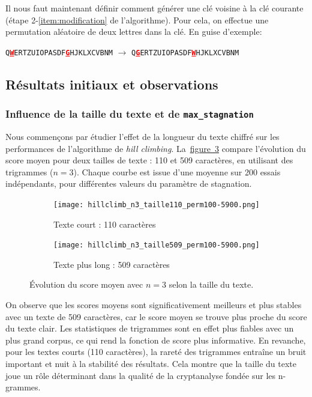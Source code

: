 \documentclass[a4paper]{article}
\newcommand{\figref}[1]{\hyperref[#1]{figure~\ref*{#1}}}
\newcommand{\highlight}[1]{\textbf{\textcolor{red}{\underline{#1}}}}
\begin{document}
Il nous faut maintenant définir comment générer une clé voisine à la clé courante (étape 2-\ref{item:modification} de l’algorithme).  
Pour cela, on effectue une permutation aléatoire de deux lettres dans la clé. En guise d'exemple:
\begin{center}
\texttt{Q\highlight{W}ERTZUIOPASDF\highlight{G}HJKLXCVBNM} $\rightarrow$ \texttt{Q\highlight{G}ERTZUIOPASDF\highlight{W}HJKLXCVBNM}
\end{center}

\subsection{Résultats initiaux et observations}

\subsubsection{Influence de la taille du texte et de \texttt{max\_stagnation}}

Nous commençons par étudier l’effet de la longueur du texte chiffré sur les performances de l’algorithme de \textit{hill climbing}. La~\figref{fig:n3-tailles} compare l’évolution du score moyen pour deux tailles de texte : 110 et 509 caractères, en utilisant des trigrammes ($n = 3$). Chaque courbe est issue d’une moyenne sur 200 essais indépendants, pour différentes valeurs du paramètre de stagnation.

\begin{figure}[H]
    \centering
    \begin{subfigure}[b]{0.49\textwidth}
        \texttt{[image: hillclimb\_n3\_taille110\_perm100-5900.png]}
        \caption{Texte court : 110 caractères}
        \label{fig:n3-110}
    \end{subfigure}
    \hfill
    \begin{subfigure}[b]{0.49\textwidth}
        \texttt{[image: hillclimb\_n3\_taille509\_perm100-5900.png]}
        \caption{Texte plus long : 509 caractères}
        \label{fig:n3-509}
    \end{subfigure}
    \caption{Évolution du score moyen avec $n = 3$ selon la taille du texte.}
    \label{fig:n3-tailles}
\end{figure}

On observe que les scores moyens sont significativement meilleurs et plus stables avec un texte
de 509 caractères, car le score moyen se trouve plus proche du score du texte clair. Les statistiques
de trigrammes sont en effet plus fiables avec un plus grand corpus, ce qui rend la fonction de score
plus informative. En revanche, pour les textes courts (110 caractères), la rareté des trigrammes
entraîne un bruit important et nuit à la stabilité des résultats. Cela montre que la taille du texte
joue un rôle déterminant dans la qualité de la cryptanalyse fondée sur les n-grammes.
\end{document}
